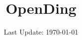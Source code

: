 \documentclass{article}
\title{OpenDing}
\date{Last Update: \today}
\begin{document}
\maketitle
\newcommand{\dir}{./songs}
\newcommand{\inputSongs}[1]{}


\newpage

\tableofcontents

\newpage


	\inputSongs{beatles}
	\inputSongs{jointVenture}
\end{document}

